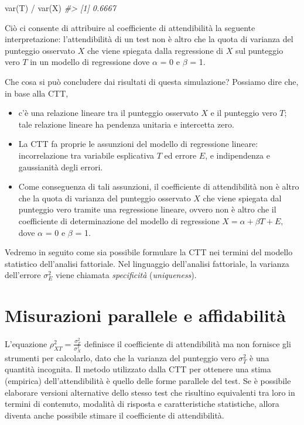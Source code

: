 \documentclass[
  11pt,
]{krantz}
\makeatletter
\newenvironment{Shaded}{\begin{snugshade}}{\end{snugshade}}
\newcommand{\CommentTok}[1]{\textcolor[rgb]{0.37,0.37,0.37}{\textit{#1}}}
\newcommand{\FunctionTok}[1]{\textcolor[rgb]{0,0,0}{#1}}
\newcommand{\NormalTok}[1]{#1}
\newcommand{\SpecialCharTok}[1]{\textcolor[rgb]{0,0,0}{#1}}
\providecommand{\tightlist}{%
  \setlength{\itemsep}{0pt}\setlength{\parskip}{0pt}}
\newenvironment{kframe}{%
\medskip{}
\setlength{\fboxsep}{.8em}
 \def\at@end@of@kframe{}%
 \ifinner\ifhmode%
  \def\at@end@of@kframe{\end{minipage}}%
  \begin{minipage}{\columnwidth}%
 \fi\fi%
 \def\FrameCommand##1{\hskip\@totalleftmargin \hskip-\fboxsep
 \colorbox{shadecolor}{##1}\hskip-\fboxsep
     \hskip-\linewidth \hskip-\@totalleftmargin \hskip\columnwidth}%
 \MakeFramed {\advance\hsize-\width
   \@totalleftmargin\z@ \linewidth\hsize
   \@setminipage}}%
 {\par\unskip\endMakeFramed%
 \at@end@of@kframe}
\renewenvironment{Shaded}{\begin{kframe}}{\end{kframe}}
\theoremstyle{definition}
\theoremstyle{definition}
\theoremstyle{definition}
\theoremstyle{definition}
\theoremstyle{remark}
\makeatother
\begin{document}
\begin{Shaded}
\begin{Highlighting}[]
\FunctionTok{var}\NormalTok{(T) }\SpecialCharTok{/} \FunctionTok{var}\NormalTok{(X)}
\CommentTok{\#\textgreater{} [1] 0.6667}
\end{Highlighting}
\end{Shaded}

Ciò ci consente di attribuire al coefficiente di attendibilità la seguente interpretazione: l'attendibilità di un test non è altro che la quota di varianza del punteggio osservato \(X\) che viene spiegata dalla regressione di \(X\) sul punteggio vero \(T\) in un modello di regressione dove \(\alpha\) = 0 e \(\beta\) = 1.

Che cosa si può concludere dai risultati di questa simulazione? Possiamo dire che, in base alla CTT,

\begin{itemize}
\tightlist
\item
  c'è una relazione lineare tra il punteggio osservato \(X\) e il punteggio vero \(T\); tale relazione lineare ha pendenza unitaria e intercetta zero.
\item
  La CTT fa proprie le assunzioni del modello di regressione lineare: incorrelazione tra variabile esplicativa \(T\) ed errore \(E\), e indipendenza e gaussianità degli errori.
\item
  Come conseguenza di tali assunzioni, il coefficiente di attendibilità non è altro che la quota di varianza del punteggio osservato \(X\) che viene spiegata dal punteggio vero tramite una regressione lineare, ovvero non è altro che il coefficiente di determinazione del modello di regressione \(X = \alpha + \beta T + E,\) dove \(\alpha\) = 0 e \(\beta\) = 1.
\end{itemize}

Vedremo in seguito come sia possibile formulare la CTT nei termini del modello statistico dell'analisi fattoriale. Nel linguaggio dell'analisi fattoriale, la varianza dell'errore \(\sigma^2_E\) viene chiamata \emph{specificità} (\emph{uniqueness}).

\hypertarget{misurazioni-parallele-e-affidabilituxe0}{%
\section{Misurazioni parallele e affidabilità}\label{misurazioni-parallele-e-affidabilituxe0}}

L'equazione \(\rho_{XT}^2 = \frac{\sigma_{T}^2}{\sigma_X^2}\) definisce il coefficiente di attendibilità ma non fornisce gli strumenti per calcolarlo, dato che la varianza del punteggio vero \(\sigma_{T}^2\) è una quantità incognita. Il metodo utilizzato dalla CTT per ottenere una stima (empirica) dell'attendibilità è quello delle forme parallele del test. Se è possibile elaborare versioni alternative dello stesso test che risultino equivalenti tra loro in termini di contenuto, modalità di risposta e caratteristiche statistiche, allora diventa anche possibile stimare il coefficiente di attendibilità.
\end{document}
